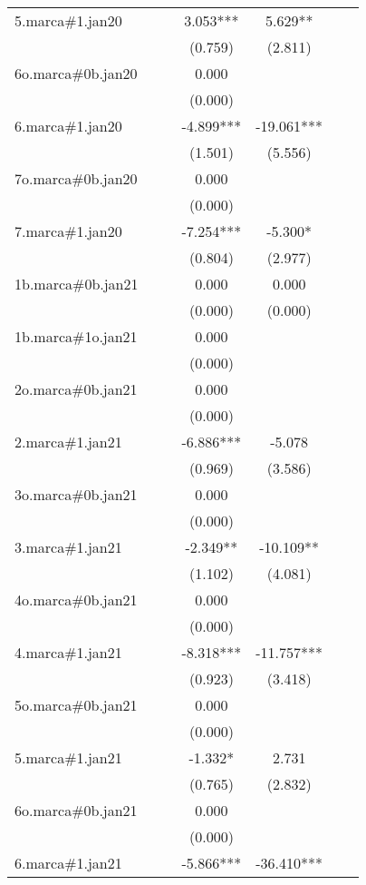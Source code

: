 \begin{tabular}{lcccccc}
5.marca\#1.jan20 &  &  & 3.053*** & 5.629** &  &  \\
 &  &  & (0.759) & (2.811) &  &  \\
6o.marca\#0b.jan20 &  &  & 0.000 &  &  &  \\
 &  &  & (0.000) &  &  &  \\
6.marca\#1.jan20 &  &  & -4.899*** & -19.061*** &  &  \\
 &  &  & (1.501) & (5.556) &  &  \\
7o.marca\#0b.jan20 &  &  & 0.000 &  &  &  \\
 &  &  & (0.000) &  &  &  \\
7.marca\#1.jan20 &  &  & -7.254*** & -5.300* &  &  \\
 &  &  & (0.804) & (2.977) &  &  \\
1b.marca\#0b.jan21 &  &  & 0.000 & 0.000 &  &  \\
 &  &  & (0.000) & (0.000) &  &  \\
1b.marca\#1o.jan21 &  &  & 0.000 &  &  &  \\
 &  &  & (0.000) &  &  &  \\
2o.marca\#0b.jan21 &  &  & 0.000 &  &  &  \\
 &  &  & (0.000) &  &  &  \\
2.marca\#1.jan21 &  &  & -6.886*** & -5.078 &  &  \\
 &  &  & (0.969) & (3.586) &  &  \\
3o.marca\#0b.jan21 &  &  & 0.000 &  &  &  \\
 &  &  & (0.000) &  &  &  \\
3.marca\#1.jan21 &  &  & -2.349** & -10.109** &  &  \\
 &  &  & (1.102) & (4.081) &  &  \\
4o.marca\#0b.jan21 &  &  & 0.000 &  &  &  \\
 &  &  & (0.000) &  &  &  \\
4.marca\#1.jan21 &  &  & -8.318*** & -11.757*** &  &  \\
 &  &  & (0.923) & (3.418) &  &  \\
5o.marca\#0b.jan21 &  &  & 0.000 &  &  &  \\
 &  &  & (0.000) &  &  &  \\
5.marca\#1.jan21 &  &  & -1.332* & 2.731 &  &  \\
 &  &  & (0.765) & (2.832) &  &  \\
6o.marca\#0b.jan21 &  &  & 0.000 &  &  &  \\
 &  &  & (0.000) &  &  &  \\
6.marca\#1.jan21 &  &  & -5.866*** & -36.410*** &  &  \\

\end{tabular}
